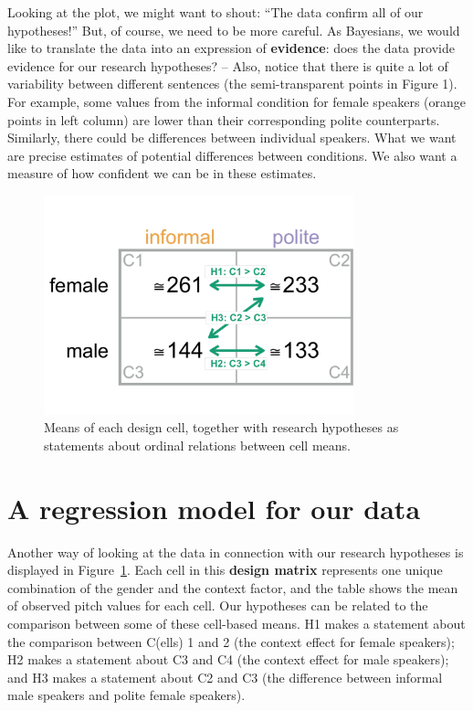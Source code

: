 \documentclass[nobib]{tufte-handout}
\newcommand{\tr}[1]{\textcolor{DarkOrange}{[tr: #1]}}
\begin{document}
Looking at the plot, we might want to shout: ``The data confirm all of our hypotheses!'' But,
of course, we need to be more careful. As Bayesians, we would like to translate the data into
an expression of \textbf{evidence}: does the data provide evidence for our research hypotheses?
-- Also, notice that there is quite a lot of variability between different sentences (the
semi-transparent points in Figure 1). For example, some values from the informal condition for
female speakers (orange points in left column) are lower than their corresponding polite
counterparts. Similarly, there could be differences between individual speakers. What we want
are precise estimates of potential differences between conditions. We also want a measure of
how confident we can be in these estimates.

\begin{figure}[h]
  \centering
    \includegraphics[width = 0.8\textwidth]{pics/table_mean_hypotheses.pdf}
    \caption{Means of each design cell, together with research hypotheses as statements about ordinal relations between cell means.}
    \label{fig:BasicPlotData_table}
\end{figure}

\section{A regression model for our data}

Another way of looking at the data in connection with our research hypotheses is displayed in
Figure~\ref{fig:BasicPlotData_table}. Each cell in this \textbf{design matrix} represents one
unique combination of the gender and the context factor, and the table shows the mean of
observed pitch values for each cell.
%
%
Our hypotheses can be related to the comparison between some of these cell-based means.
H1 makes a statement about the comparison between C(ells) 1 and 2 (the context effect for female speakers); H2 makes a statement about C3 and C4 (the context effect for male speakers); and H3 makes a statement about C2 and C3 (the difference between informal male speakers and polite female speakers).
\end{document}
